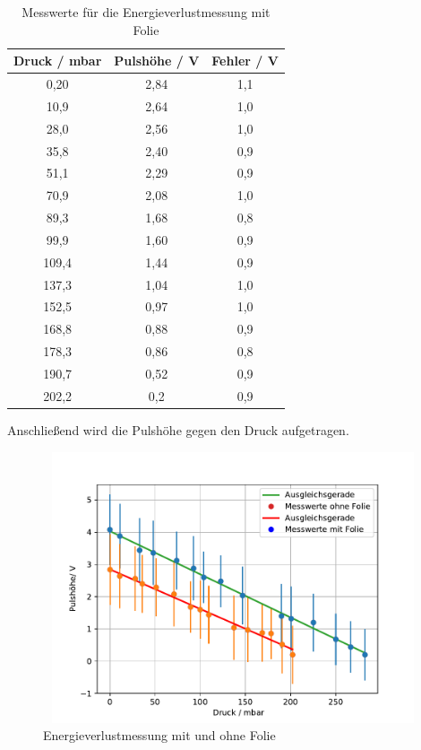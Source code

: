 \documentclass{article}
\begin{document}
\begin{table}[H] 
	\centering
	\begin{tabular}{c|c|c}
		
		Druck / mbar& Pulshöhe  / V & Fehler / V\\ 
		\hline 
		0,20  & 2,84& 1,1\\ 
		
		10,9 & 2,64 &1,0\\ 
		
		28,0 &2,56 & 1,0\\ 
		
		35,8 & 2,40&0,9\\ 
		
		51,1 & 2,29 &0,9\\ 
		
		70,9 & 2,08&1,0 \\ 
		
		89,3 &  1,68 &0,8\\ 
		
		99,9 & 1,60 &0,9\\ 
		
		109,4 & 1,44 &0,9\\ 
		
		137,3 & 1,04 &1,0\\ 
		
		152,5 & 0,97& 1,0\\
		
		168,8 & 0,88&0,9\\
		
		178,3& 0,86&0,8\\
		
		190,7 & 0,52&0,9\\
		
		202,2& 0,2 &0,9\\
		
	\end{tabular} 
	\caption{Messwerte für die Energieverlustmessung mit Folie } 
\end{table} 

Anschließend wird die Pulshöhe gegen den Druck aufgetragen. 

	\begin{figure}[H]
	
	\centering
	\includegraphics[height=8cm,width=12cm]{foliendicke.pdf}
	\caption{ Energieverlustmessung mit und ohne Folie}
	\label{fig: abb. 1}
	
	
\end{figure} 
\end{document}
